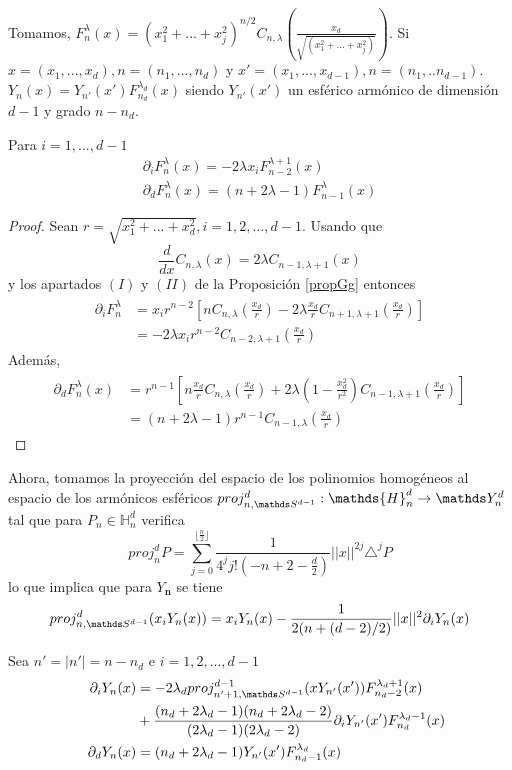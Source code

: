 Tomamos, $F_n^\lambda (x) = (x_1^2+...+x_j^2)^{n/2}C_{n,\lambda}(\frac{x_d}{\sqrt{(x_1^2+...+x_j^2)}})$.
Si $x=(x_1,...,x_d), n=(n_1,...,n_d)$ y $x' = (x_1,...,x_{d-1}), n=(n_1,..n_{d-1})$.
$Y_n(x) = Y_{n'}(x') F_{n_d}^{\lambda_d} (x)$ siendo $ Y_{n'}(x')$ un esférico armónico de dimensión $d-1$ y grado $n-n_d$.
\begin{prop}Para $i=1,...,d-1$
	\begin{gather*}
	\partial_i  F_{n}^\lambda(x) = -2\lambda x_i F_{n-2}^{\lambda+1}(x) \\ 
	\partial_d F_{n}^{\lambda}(x) = (n+2\lambda-1)  F_{n-1}^{\lambda}(x)
	\end{gather*}
\end{prop}
\begin{proof}
	Sean $r=\sqrt{x_1^2+...+x_d^2},i=1,2,...,d-1$. Usando que $$\frac{d}{dx}C_{n,\lambda}(x) = 2\lambda C_{n-1,\lambda+1}(x)$$ y los apartados $(I)$ y $(II)$ de la Proposición \ref{propGg} entonces
	\begin{gather*}
	\begin{aligned}
	\partial_i F_{n}^{\lambda} &= x_i r^{n-2} \left[ n C_{n,\lambda}(\frac{x_d}{r})-2\lambda\frac{x_d}{r}C_{n+1,\lambda+1}(\frac{x_d}{r})\right] \\&= -2\lambda x_ir^{n-2}C_{n-2,\lambda+1}(\frac{x_d}{r})
	\end{aligned}
	\end{gather*}
	Además,
	\begin{gather*}
		\begin{aligned}
		\partial_d F_{n}^{\lambda}(x) &= r^{n-1}\left[n\frac{x_d}{r}C_{n,\lambda}(\frac{x_d}{r})+2\lambda(1-\frac{x_d^2}{r^2})C_{n-1,\lambda+1}(\frac{x_d}{r})\right] \\&= (n+2\lambda-1)r^{n-1}C_{n-1,\lambda}(\frac{x_d}{r})		
		\end{aligned}
	\end{gather*}
	
	
\end{proof}
Ahora, tomamos la proyección del espacio de los polinomios homogéneos al espacio de los armónicos esféricos $proj_{n,\sphere}^d : \mathds{H}_n^d \to \spharm$ tal que para $P_n\in \mathds{H}_n^d$ verifica 
$$ proj_{n}^d P = \sum_{j=0}^{\lfloor \frac{n}{2} \rfloor}\frac{1}{4^j j! (-n+2-\frac{d}{2})} ||x||^{2j} \triangle^jP
$$
lo que implica que para $Y_\textbf{n}$ se tiene
$$
proj_{n,\sphere}^d (x_iY_{n}(x)) = x_i Y_n(x)-\frac{1}{2(n+(d-2)/2)} ||x||^2 \partial_i Y_n(x)$$
\begin{prop}Sea $n'=|n'|=n-n_d$ e $i=1,2,...,d-1$
	\begin{gather*}
	\begin{aligned}
	\partial_i Y_n(x) &= -2\lambda_d proj_{n'+1,\sphere}^{d-1}(xY_{n'}(x'))F_{n_d-2}^{\lambda_d+1}(x)\\   &+\frac{(n_d+2\lambda_d-1)(n_d+2\lambda_d-2)}{(2\lambda_d-1)(2\lambda_d-2)}\partial_iY_{n'}(x')F_{n_d}^{\lambda_d-1}(x) \\ \quad
	\partial_dY_n(x) &= (n_d+2\lambda_d-1)Y_{n'}(x')F_{n_d-1}^{\lambda_d}(x)
	\end{aligned}
	\end{gather*}
\end{prop}
